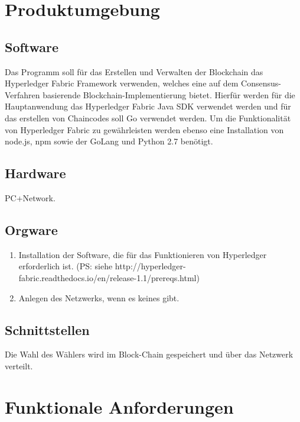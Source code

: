 \documentclass[parskip=full,11pt,twoside]{scrartcl}
\begin{document}
\section{Produktumgebung}

\subsection{Software}
Das Programm soll für das Erstellen und Verwalten der Blockchain das Hyperledger Fabric Framework verwenden, welches eine auf dem Consensus-Verfahren basierende Blockchain-Implementierung bietet.
Hierfür werden für die Hauptanwendung das Hyperledger Fabric Java SDK verwendet werden und für  das erstellen von Chaincodes soll Go verwendet werden.
Um die Funktionalität von Hyperledger Fabric zu gewährleisten werden ebenso eine Installation von node.js, npm sowie der GoLang und Python 2.7 benötigt.

\subsection{Hardware}
PC+Network.

\subsection{Orgware}
\begin{enumerate}
\item Installation der Software, die für das Funktionieren von Hyperledger erforderlich ist. (PS: siehe http://hyperledger-fabric.readthedocs.io/en/release-1.1/prereqs.html)
\item Anlegen des Netzwerks, wenn es keines gibt.
\end{enumerate}

\subsection{Schnittstellen}
Die Wahl des Wählers wird im Block-Chain gespeichert und über das Netzwerk verteilt.

\section{Funktionale Anforderungen}
\end{document}
